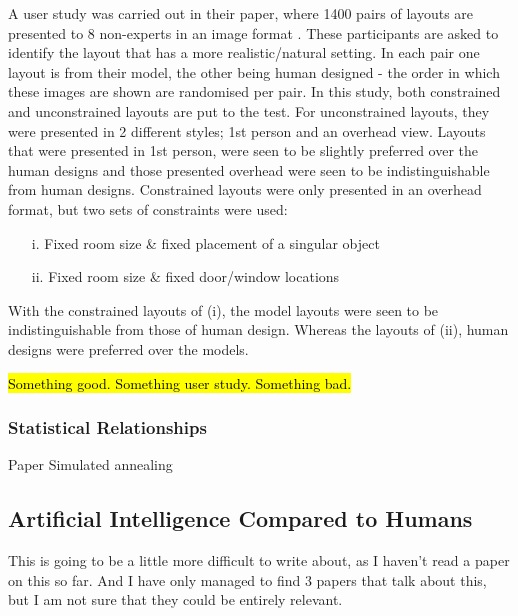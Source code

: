 A user study was carried out in their paper, where 1400 pairs of layouts are presented to 8 non-experts in an image format \cite{constrained-layouts}. These participants are asked to identify the layout that has a more realistic/natural setting. In each pair one layout is from their model, the other being human designed - the order in which these images are shown are randomised per pair.
In this study, both constrained and unconstrained layouts are put to the test. For unconstrained layouts, they were presented in 2 different styles; 1st person and an overhead view. Layouts that were presented in 1st person, were seen to be slightly preferred over the human designs and those presented overhead were seen to be indistinguishable from human designs.
Constrained layouts were only presented in an overhead format, but two sets of constraints were used:
\begin{enumerate}
    \item[i.] Fixed room size \& fixed placement of a singular object
    \item[ii.] Fixed room size \& fixed door/window locations
\end{enumerate}
With the constrained layouts of (i), the model layouts were seen to be indistinguishable from those of human design. Whereas the layouts of (ii), human designs were preferred over the models.

\hl{Something good. Something user study. Something bad.}

\subsubsection*{Statistical Relationships}
Paper \cite{make-it-home}
Simulated annealing \cite[Chapter~3]{simulated-annealing}

\subsection{Artificial Intelligence Compared to Humans}
This is going to be a little more difficult to write about, as I haven't read a paper on this so far. And I have only managed to find 3 papers that talk about this, but I am not sure that they could be entirely relevant.